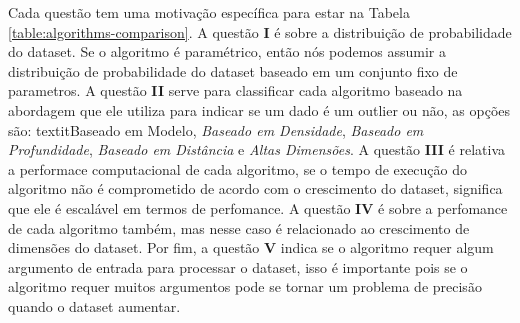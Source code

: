 
Cada questão tem uma motivação específica para estar na Tabela \ref{table:algorithms-comparison}. A questão \textbf{I} é sobre a distribuição de probabilidade do dataset. Se o algoritmo é paramétrico, então nós podemos assumir a distribuição de probabilidade do dataset baseado em um conjunto fixo de parametros. A questão \textbf{II} serve para classificar cada algoritmo baseado na abordagem que ele utiliza para indicar se um dado é um outlier ou não, as opções são: textit{Baseado em Modelo}, \textit{Baseado em Densidade}, \textit{Baseado em Profundidade}, \textit{Baseado em Distância} e \textit{Altas Dimensões}. A questão \textbf{III} é relativa a performace computacional de cada algoritmo, se o tempo de execução do algoritmo não é comprometido de acordo com o crescimento do dataset, significa que ele é escalável em termos de perfomance. A questão \textbf{IV} é sobre a perfomance de cada algoritmo também, mas nesse caso é relacionado ao crescimento de dimensões do dataset. Por fim, a questão \textbf{V} indica se o algoritmo requer algum argumento de entrada para processar o dataset, isso é importante pois se o algoritmo requer muitos argumentos pode se tornar um problema de precisão quando o dataset aumentar.